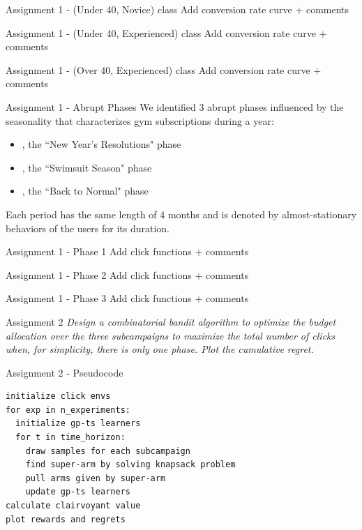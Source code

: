 \documentclass[11pt]{beamer}
\begin{document}
\begin{frame}{Assignment 1 - (Under 40, Novice) class}
Add conversion rate curve + comments
\end{frame}

\begin{frame}{Assignment 1 - (Under 40, Experienced) class}
Add conversion rate curve + comments
\end{frame}

\begin{frame}{Assignment 1 - (Over 40, Experienced) class}
Add conversion rate curve + comments
\end{frame}

\begin{frame}{Assignment 1 - Abrupt Phases}
We identified 3 abrupt phases influenced by the seasonality that characterizes gym subscriptions during a year:
\begin{itemize}
\item [1.] [January-April], the ``New Year's Resolutions" phase
\item [2.] [May-August], the ``Swimsuit Season" phase
\item [3.] [September-December], the ``Back to Normal" phase
\end{itemize}
\vspace{\baselineskip}
Each period has the same length of 4 months and is denoted by almost-stationary behaviors of the users for its duration. 
\end{frame} 

\begin{frame}{Assignment 1 - Phase 1}
Add click functions + comments
\end{frame}

\begin{frame}{Assignment 1 - Phase 2}
Add click functions + comments
\end{frame}

\begin{frame}{Assignment 1 - Phase 3}
Add click functions + comments
\end{frame}

\begin{frame}{Assignment 2}
\textit{Design a combinatorial bandit algorithm to optimize the budget allocation over the three subcampaigns to maximize the total number of clicks when, for simplicity, there is only one phase. Plot the cumulative regret.}
\end{frame}

\begin{frame}[fragile]{Assignment 2 - Pseudocode}
\begin{lstlisting}
initialize click envs
for exp in n_experiments:
  initialize gp-ts learners
  for t in time_horizon:
    draw samples for each subcampaign
    find super-arm by solving knapsack problem
    pull arms given by super-arm
    update gp-ts learners
calculate clairvoyant value
plot rewards and regrets
\end{lstlisting}
\end{frame}
\end{document}
